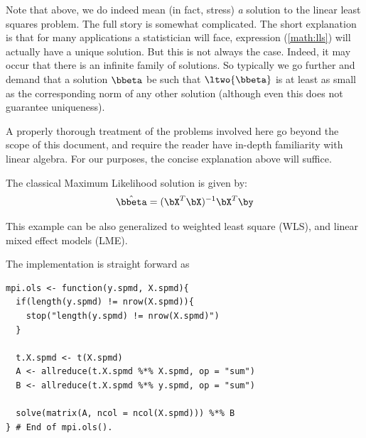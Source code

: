 Note that above, we do indeed mean (in fact, stress) \emph{a} solution to the linear least squares problem.  The full story is somewhat complicated.  The short explanation is that for many applications a statistician will face, expression (\ref{math:lls}) will actually have a unique solution.  But this is not always the case.  Indeed, it may occur that there is an infinite family of solutions.  So typically we go further and demand that a solution $\bbeta$ be such that $\ltwo{\bbeta}$ is at least as small as the corresponding norm of any other solution (although even this does not guarantee uniqueness).

A properly thorough treatment of the problems involved here go beyond the scope of this document, and require the reader have in-depth familiarity with linear algebra.  For our purposes, the concise explanation above will suffice.

The classical Maximum Likelihood solution is given by:
\begin{align}
 \hat{\bbeta} = (\bX^T\bX)^{-1}\bX^T\by \label{math:ols}
\end{align}
 
This example can be also generalized to weighted least square (WLS),
and linear mixed effect models (LME).

The implementation is straight forward as
\begin{lstlisting}[language=rr,title=R Code]
mpi.ols <- function(y.spmd, X.spmd){
  if(length(y.spmd) != nrow(X.spmd)){
    stop("length(y.spmd) != nrow(X.spmd)")
  }

  t.X.spmd <- t(X.spmd)
  A <- allreduce(t.X.spmd %*% X.spmd, op = "sum")
  B <- allreduce(t.X.spmd %*% y.spmd, op = "sum")

  solve(matrix(A, ncol = ncol(X.spmd))) %*% B
} # End of mpi.ols().

\end{lstlisting}

